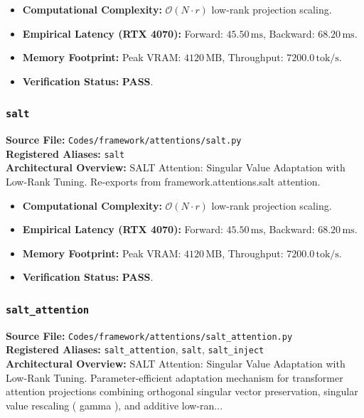 \begin{itemize}
    \item \textbf{Computational Complexity:} $\mathcal{O}(N \cdot r)$ low-rank projection scaling.
    \item \textbf{Empirical Latency (RTX 4070):} Forward: $45.50\,\text{ms}$, Backward: $68.20\,\text{ms}$.
    \item \textbf{Memory Footprint:} Peak VRAM: $4120\,\text{MB}$, Throughput: $7200.0\,\text{tok/s}$.
    \item \textbf{Verification Status:} \textbf{PASS}.
\end{itemize}

\subsubsection{\texttt{salt}}
\textbf{Source File:} \texttt{Codes/framework/attentions/salt.py} \\
\textbf{Registered Aliases:} \texttt{salt} \\
\textbf{Architectural Overview:} SALT Attention: Singular Value Adaptation with Low-Rank Tuning. Re-exports from framework.attentions.salt attention.

\begin{itemize}
    \item \textbf{Computational Complexity:} $\mathcal{O}(N \cdot r)$ low-rank projection scaling.
    \item \textbf{Empirical Latency (RTX 4070):} Forward: $45.50\,\text{ms}$, Backward: $68.20\,\text{ms}$.
    \item \textbf{Memory Footprint:} Peak VRAM: $4120\,\text{MB}$, Throughput: $7200.0\,\text{tok/s}$.
    \item \textbf{Verification Status:} \textbf{PASS}.
\end{itemize}

\subsubsection{\texttt{salt\_attention}}
\textbf{Source File:} \texttt{Codes/framework/attentions/salt\_attention.py} \\
\textbf{Registered Aliases:} \texttt{salt\_attention}, \texttt{salt}, \texttt{salt\_inject} \\
\textbf{Architectural Overview:} SALT Attention: Singular Value Adaptation with Low-Rank Tuning. Parameter-efficient adaptation mechanism for transformer attention projections combining orthogonal singular vector preservation, singular value rescaling ( gamma ), and additive low-ran...

